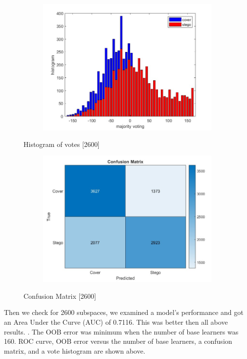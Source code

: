 \begin{figure}[H]
    \centering
    \begin{subfigure}[b]{0.5\textwidth}
        \includegraphics[width=\textwidth]{img/2600/histo2600.jpg}
    \end{subfigure}
    \caption{Histogram of votes [2600]}
\begin{table}[H]
    \centering
        \begin{subfigure}[b]{0.5\textwidth}
            \includegraphics[width=\textwidth]{img/2600/consuse2600.jpg}
        \end{subfigure}
    \caption{Confusion Matrix [2600]}
\end{table}
\end{figure}
Then we check for 2600 subspaces, we examined a model's performance and got an Area Under the Curve (AUC) of 0.7116. This was better then all above results. . The OOB error was minimum when the number of base learners was 160.  ROC curve, OOB error versus the number of base learners, a confusion matrix, and a vote histogram are shown above.
\clearpage
